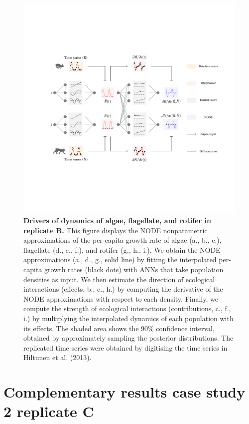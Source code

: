 \documentclass[11pt, oneside]{article}
\begin{document}
\newpage
\begin{figure}[H]
\includegraphics[width=1\linewidth,page=19]{figures/main.pdf}
\caption{
    \textbf{Drivers of dynamics of algae, flagellate, and rotifer in replicate B.}
    This figure displays the NODE nonparametric approximations of the per-capita growth rate of algae (a., b., c.), flagellate (d., e., f.), and rotifer (g., h., i.).
    We obtain the NODE approximations (a., d., g., solid line) by fitting the interpolated per-capita growth rates (black dots) with ANNs that take population densities as input.
    We then estimate the direction of ecological interactions (effects, b., e., h.) by computing the derivative of the NODE approximations with respect to each density.
    Finally, we compute the strength of ecological interactions (contributions, c., f., i.) by multiplying the interpolated dynamics of each population with its effects.
    The shaded area shows the 90\% confidence interval, obtained by approximately sampling the posterior distributions. 
    The replicated time series were obtained by digitising the time series in Hiltunen et al. (2013).
}
\end{figure}
\newpage

\newpage
\section{Complementary results case study 2 replicate C}
\end{document}
